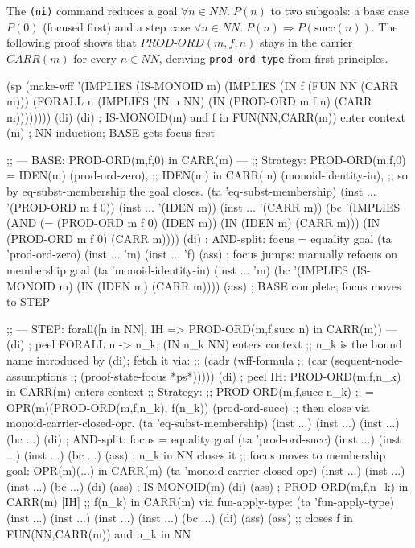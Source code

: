 The \texttt{(ni)} command reduces a goal
$\forall n \in \mathit{NN}.\; P(n)$ to two subgoals:
a base case $P(0)$ (focused first) and a step case
$\forall n \in \mathit{NN}.\; P(n) \Rightarrow P(\mathrm{succ}(n))$.
The following proof shows that $\mathit{PROD\text{-}ORD}(m, f, n)$
stays in the carrier $\mathit{CARR}(m)$ for every $n \in \mathit{NN}$,
deriving \texttt{prod-ord-type} from first principles.

\begin{VNBcode}
(sp (make-wff '(IMPLIES (IS-MONOID m)
               (IMPLIES (IN f (FUN NN (CARR m)))
                 (FORALL n (IMPLIES (IN n NN)
                   (IN (PROD-ORD m f n) (CARR m))))))))
(di) (di)   ; IS-MONOID(m) and f in FUN(NN,CARR(m)) enter context
(ni)        ; NN-induction; BASE gets focus first

;; --- BASE: PROD-ORD(m,f,0) in CARR(m) ---
;; Strategy: PROD-ORD(m,f,0) = IDEN(m) (prod-ord-zero),
;;           IDEN(m) in CARR(m)            (monoid-identity-in),
;;           so by eq-subst-membership the goal closes.
(ta 'eq-subst-membership)
(inst ... '(PROD-ORD m f 0)) (inst ... '(IDEN m)) (inst ... '(CARR m))
(bc '(IMPLIES (AND (= (PROD-ORD m f 0) (IDEN m)) (IN (IDEN m) (CARR m)))
              (IN (PROD-ORD m f 0) (CARR m))))
(di)    ; AND-split: focus = equality goal
(ta 'prod-ord-zero) (inst ... 'm) (inst ... 'f) (ass)
        ; focus jumps: manually refocus on membership goal
(ta 'monoid-identity-in) (inst ... 'm)
(bc '(IMPLIES (IS-MONOID m) (IN (IDEN m) (CARR m)))) (ass)
        ; BASE complete; focus moves to STEP

;; --- STEP: forall([n in NN], IH => PROD-ORD(m,f,succ n) in CARR(m)) ---
(di)    ; peel FORALL n -> n_k; (IN n_k NN) enters context
;; n_k is the bound name introduced by (di); fetch it via:
;;   (cadr (wff-formula
;;           (car (sequent-node-assumptions
;;                  (proof-state-focus *ps*)))))
(di)    ; peel IH: PROD-ORD(m,f,n_k) in CARR(m) enters context
;; Strategy:
;;   PROD-ORD(m,f,succ n_k)
;;     = OPR(m)(PROD-ORD(m,f,n_k), f(n_k))   (prod-ord-succ)
;;   then close via monoid-carrier-closed-opr.
(ta 'eq-subst-membership) (inst ...) (inst ...) (inst ...)
(bc ...)
(di)    ; AND-split: focus = equality goal
(ta 'prod-ord-succ)
(inst ...) (inst ...) (inst ...)
(bc ...) (ass)   ; n_k in NN closes it
;; focus moves to membership goal: OPR(m)(...) in CARR(m)
(ta 'monoid-carrier-closed-opr)
(inst ...) (inst ...) (inst ...)
(bc ...)
(di) (ass)   ; IS-MONOID(m)
(di) (ass)   ; PROD-ORD(m,f,n_k) in CARR(m) [IH]
;; f(n_k) in CARR(m) via fun-apply-type:
(ta 'fun-apply-type)
(inst ...) (inst ...) (inst ...) (inst ...)
(bc ...) (di) (ass) (ass)
;; closes f in FUN(NN,CARR(m)) and n_k in NN
\end{VNBcode}

